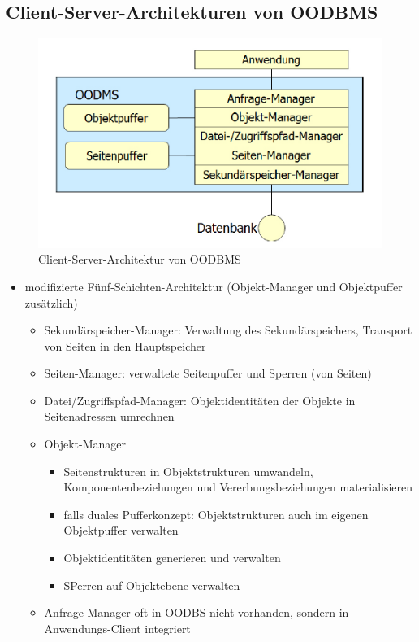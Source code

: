 \subsection{Client-Server-Architekturen von OODBMS}
\begin{figure}[!h]
	\centering
	\includegraphics[scale=0.7]{img/client_server_oodbms.png}
	\caption{Client-Server-Architektur von OODBMS}
\end{figure}

\begin{itemize}
	\item modifizierte Fünf-Schichten-Architektur (Objekt-Manager und Objektpuffer zusätzlich)
	\begin{itemize}
		\item Sekundärspeicher-Manager: Verwaltung des Sekundärspeichers, Transport von Seiten in den Hauptspeicher
		\item Seiten-Manager: verwaltete Seitenpuffer und Sperren (von Seiten)
		\item Datei/Zugriffspfad-Manager: Objektidentitäten der Objekte in Seitenadressen umrechnen
		\item Objekt-Manager
		\begin{itemize}
			\item Seitenstrukturen in Objektstrukturen umwandeln, Komponentenbeziehungen und Vererbungsbeziehungen materialisieren
			\item falls duales Pufferkonzept: Objektstrukturen auch im eigenen Objektpuffer verwalten
			\item  Objektidentitäten generieren und verwalten
			\item SPerren auf Objektebene verwalten
		\end{itemize}
		\item Anfrage-Manager oft in OODBS nicht vorhanden, sondern in Anwendungs-Client integriert
	\end{itemize}
\end{itemize}

